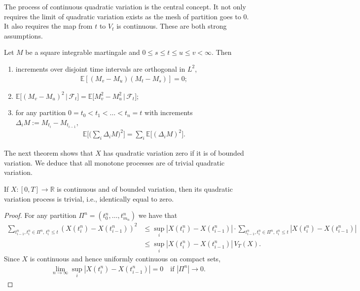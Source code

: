The process of continuous quadratic variation is the central concept. 
It not only requires the limit of quadratic variation exists as the mesh of partition goes to 0. 
It also requires the map from $t$ to $V_t$ is continuous. These are both strong assumptions.

\begin{lemma}[properties]
	Let $M$ be a square integrable martingale and $0 \le s \le t \le u \le v < \infty$. Then
	\begin{enumerate}
		\item increments over disjoint time intervals are orthogonal in $L^2$,
		\begin{align*}
			\mathbb{E}[(M_v - M_u)(M_t - M_s)] = 0;
		\end{align*}
		\item $\mathbb{E}\big[ (M_v - M_u)^2 \,\big|\, \mathcal{F}_t \big] = \mathbb{E}\big[ M_v^2 - M_u^2 \,\big|\, \mathcal{F}_t \big]$;
		\item for any partition $0 = t_0 < t_1 < \dots < t_n = t$ with increments $\Delta_i M := M_{t_i} - M_{t_{i-1}}$,
		\begin{align*}
			\mathbb{E}\Big[ \Big( \sum_i \Delta_i M \Big)^2 \Big] = \sum_i \mathbb{E}\big[ (\Delta_i M)^2 \big].
		\end{align*}
	\end{enumerate}
\end{lemma}


The next theorem shows that $X$ has quadratic variation zero if it is of bounded variation. 
We deduce that all monotone processes are of trivial quadratic variation.
\begin{theorem}
	If $X : [0, T] \rightarrow \mathbb{R}$ is continuous and of bounded variation, then its quadratic variation process is trivial, i.e., identically equal to zero.
\end{theorem}
\begin{proof}
	For any partition $\Pi^n = (t_0^n, \dots, t_{m_n}^n)$ we have that
	\begin{align*}
		\sum_{t_{i-1}^n, t_i^n \in \Pi^n,\, t_i^n \le t} \left( X(t_i^n) - X(t_{i-1}^n) \right)^2
		&\le \sup_i |X(t_i^n) - X(t_{i-1}^n)| \cdot \sum_{t_{i-1}^n, t_i^n \in \Pi^n,\, t_i^n \le t} |X(t_i^n) - X(t_{i-1}^n)|\\
		&\le \sup_i |X(t_i^n) - X(t_{i-1}^n)| \, V_T(X).
	\end{align*}
	Since $X$ is continuous and hence uniformly continuous on compact sets,
	\begin{align*}
		\lim_{n \rightarrow \infty} \sup_i |X(t_i^n) - X(t_{i-1}^n)| = 0 \quad \text{if } |\Pi^n| \rightarrow 0.
	\end{align*}
\end{proof}


